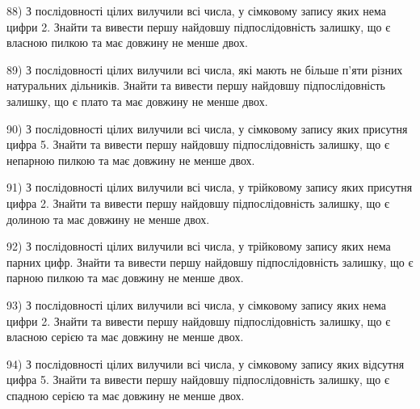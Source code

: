 \documentclass[11pt, ukrainian]{article}
\begin{document}
\par
\vspace{0.9cm}
88) \space 
З послідовності цілих вилучили всі числа, у сімковому запису яких нема цифри 2. Знайти та вивести першу найдовшу підпослідовність залишку, що є власною пилкою та має довжину не менше двох.

\par
\vspace{0.9cm}
89) \space 
З послідовності цілих вилучили всі числа, які мають не більше п'яти різних натуральних дільників. Знайти та вивести першу найдовшу підпослідовність залишку, що є плато та має довжину не менше двох.

\par
\vspace{0.9cm}
90) \space 
З послідовності цілих вилучили всі числа, у сімковому запису яких присутня цифра 5. Знайти та вивести першу найдовшу підпослідовність залишку, що є непарною пилкою та має довжину не менше двох.

\par
\vspace{0.9cm}
91) \space 
З послідовності цілих вилучили всі числа, у трійковому запису яких присутня цифра 2. Знайти та вивести першу найдовшу підпослідовність залишку, що є долиною та має довжину не менше двох.

\par
\vspace{0.9cm}
92) \space 
З послідовності цілих вилучили всі числа, у трійковому запису яких нема парних цифр. Знайти та вивести першу найдовшу підпослідовність залишку, що є парною пилкою та має довжину не менше двох.

\par
\vspace{0.9cm}
93) \space 
З послідовності цілих вилучили всі числа, у сімковому запису яких нема цифри 2. Знайти та вивести першу найдовшу підпослідовність залишку, що є власною серією та має довжину не менше двох.

\par
\vspace{0.9cm}
94) \space 
З послідовності цілих вилучили всі числа, у сімковому запису яких відсутня цифра 5. Знайти та вивести першу найдовшу підпослідовність залишку, що є спадною серією та має довжину не менше двох.
\end{document}
